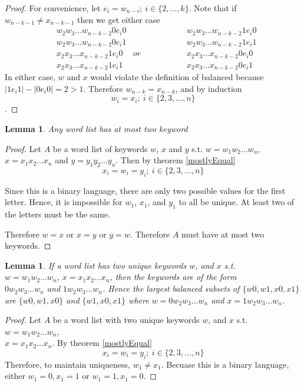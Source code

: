 \documentclass{article}
\newtheorem{lemma}[theorem]{Lemma}
\begin{document}
\begin{proof}
For convenience, let $e_i = w_{n-i};\ i \in \{2,...,k\}$. Note that if $w_{n-k-1} \neq x_{n-k-1}$ then we get either case
\begin{align*}
    &w_2w_3...w_{n-k-2}0e_i0 &               & w_2w_3...w_{n-k-2}1e_i0  \\
    &w_2w_3...w_{n-k-2}0e_i1 &               & w_2w_3...w_{n-k-2}1e_i1  \\
    &x_2x_3...x_{n-k-2}1e_i0 &or \hspace{2cm}& x_2x_3...x_{n-k-2}0e_i0  \\
    &x_2x_3...x_{n-k-2}1e_i1 &               & x_2x_3...x_{n-k-2}0e_i1 
\end{align*}
In either case, $w$ and $x$ would violate the definition of balanced because \\ $|1e_i1| - |0e_i0| = 2 > 1$. Therefore $w_{n-k} = x_{n-k}$, and by induction 
$$w_i = x_i;\ i \in \{2,3,...,n\}$$.
\end{proof}

\begin{lemma}
    Any  word list has at most two keyword
\end{lemma}
\begin{proof}
    Let $A$ be a word list of keywords  $w$, $x$ and $y$ s.t. $w = w_1w_2...w_{n}$, \\ $x = x_1x_2...x_{n}$ and $y = y_1y_2...y_n$. Then by theorem \ref{mostlyEqual}
    $$x_i = w_i = y_i;\ i \in \{2, 3, ..., n\}$$

Since this is a binary language, there are only two possible values for the first letter. Hence, it is impossible for $w_1$, $x_1$, and $y_1$ to all be unique. At least two of the letters must be the same.

Therefore $w = x$ or $x = y$ or $y = w$. Therefore $A$ must have at most two keywords.
\end{proof}

\begin{lemma}\label{01first}
    If a word list has two unique keywords $w$, and $x$ s.t. \\$w = w_1w_2...w_{n}$, $x = x_1x_2...x_{n}$, then the keywords are of the form \\$0w_2w_3...w_n$ and $1w_2w_3...w_n$. Hence the largest balanced subsets of $\{w0, w1, x0, x1 \}$ are $\{w0, w1, x0\}$ and $\{w1, x0, x1\}$ where $w = 0w_2w_3...w_n$ and $x = 1w_2w_3...w_n$.
\end{lemma}
\begin{proof}
    Let $A$ be a word list with two unique keywords $w$, and $x$ s.t. $w = w_1w_2...w_{n}$, \\ $x = x_1x_2...x_{n}$. By theorem \ref{mostlyEqual} 
    $$x_i = w_i = y_i;\ i \in \{2, 3, ..., n\}$$
    Therefore, to maintain uniqueness, $w_1 \ne x_1$. Becuase this is a binary language, either $w_1 = 0, x_1 = 1$ or $w_1 = 1, x_1 = 0$.
\end{proof}
\end{document}
